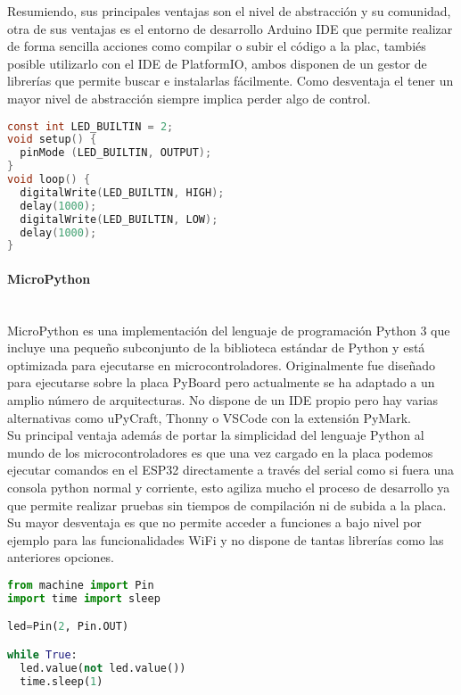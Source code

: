 \documentclass[../proyecto.tex]{subfiles}
\begin{document}
Resumiendo, sus principales ventajas son el nivel de abstracción y su comunidad, otra de sus ventajas es el entorno de desarrollo Arduino IDE que permite realizar de forma sencilla acciones como compilar o subir el código a la plac, tambiés posible utilizarlo con el IDE de PlatformIO, ambos disponen de un gestor de librerías que permite buscar e instalarlas fácilmente. Como desventaja el tener un mayor nivel de abstracción siempre implica perder algo de control.\\

\begin{minipage}{\linewidth}
\begin{lstlisting}[language=C, caption=Ejemplo de código para hacer parpadear un led con Arduino, captionpos=b, frame=single]
const int LED_BUILTIN = 2;
void setup() {
  pinMode (LED_BUILTIN, OUTPUT);
}
void loop() {
  digitalWrite(LED_BUILTIN, HIGH);
  delay(1000);
  digitalWrite(LED_BUILTIN, LOW);
  delay(1000);
}
\end{lstlisting}
\end{minipage}

\paragraph{MicroPython}\mbox{}\\
MicroPython es una implementación del lenguaje de programación Python 3 que incluye una pequeño subconjunto de la biblioteca estándar de Python y está optimizada para ejecutarse en microcontroladores. Originalmente fue diseñado para ejecutarse sobre la placa PyBoard pero actualmente se ha adaptado a un amplio número de arquitecturas. No dispone de un IDE propio pero hay varias alternativas como uPyCraft, Thonny o  VSCode con la extensión PyMark.\\

Su principal ventaja además de portar la simplicidad del lenguaje Python al mundo de los microcontroladores es que una vez cargado en la placa podemos ejecutar comandos en el ESP32 directamente a través del serial como si fuera una consola python normal y corriente, esto agiliza mucho el proceso de desarrollo ya que permite realizar pruebas sin tiempos de compilación ni de subida a la placa. Su mayor desventaja es que no permite acceder  a funciones a bajo nivel por ejemplo para las funcionalidades WiFi y no dispone de tantas librerías como las anteriores opciones.\\

\begin{minipage}{\linewidth}
\begin{lstlisting}[language=Python, caption=Ejemplo de código para hacer parpadear un led con MicroPython, captionpos=b, frame=single]
from machine import Pin
import time import sleep

led=Pin(2, Pin.OUT)

while True:
  led.value(not led.value())
  time.sleep(1)
\end{lstlisting}
\end{minipage}
\end{document}
